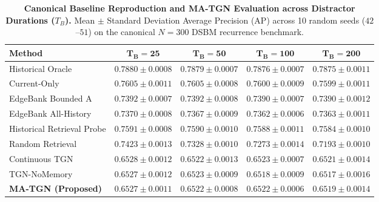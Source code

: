 \begin{table}[t]
\centering
\small
\caption{\textbf{Canonical Baseline Reproduction and MA-TGN Evaluation across Distractor Durations ($T_B$).} Mean $\pm$ Standard Deviation Average Precision (AP) across 10 random seeds ($42$--$51$) on the canonical $N=300$ DSBM recurrence benchmark.}
\label{tab:canonical_baselines}
\begin{tabular}{lcccc}
\toprule
\textbf{Method} & $\mathbf{T_B = 25}$ & $\mathbf{T_B = 50}$ & $\mathbf{T_B = 100}$ & $\mathbf{T_B = 200}$ \\
\midrule
Historical Oracle & $0.7880 \pm 0.0008$ & $0.7879 \pm 0.0007$ & $0.7876 \pm 0.0007$ & $0.7875 \pm 0.0011$ \\
Current-Only & $0.7605 \pm 0.0011$ & $0.7605 \pm 0.0008$ & $0.7600 \pm 0.0009$ & $0.7599 \pm 0.0011$ \\
EdgeBank Bounded A & $0.7392 \pm 0.0007$ & $0.7392 \pm 0.0008$ & $0.7390 \pm 0.0007$ & $0.7390 \pm 0.0012$ \\
EdgeBank All-History & $0.7370 \pm 0.0008$ & $0.7367 \pm 0.0009$ & $0.7362 \pm 0.0006$ & $0.7363 \pm 0.0011$ \\
Historical Retrieval Probe & $0.7591 \pm 0.0008$ & $0.7590 \pm 0.0010$ & $0.7588 \pm 0.0011$ & $0.7584 \pm 0.0010$ \\
Random Retrieval & $0.7423 \pm 0.0013$ & $0.7328 \pm 0.0010$ & $0.7273 \pm 0.0014$ & $0.7193 \pm 0.0010$ \\
\midrule
Continuous TGN & $0.6528 \pm 0.0012$ & $0.6522 \pm 0.0013$ & $0.6523 \pm 0.0007$ & $0.6521 \pm 0.0014$ \\
TGN-NoMemory & $0.6527 \pm 0.0012$ & $0.6523 \pm 0.0009$ & $0.6518 \pm 0.0009$ & $0.6517 \pm 0.0016$ \\
\textbf{MA-TGN (Proposed)} & $\mathbf{0.6527 \pm 0.0011}$ & $\mathbf{0.6522 \pm 0.0008}$ & $\mathbf{0.6522 \pm 0.0006}$ & $\mathbf{0.6519 \pm 0.0014}$ \\
\bottomrule
\end{tabular}
\end{table}

